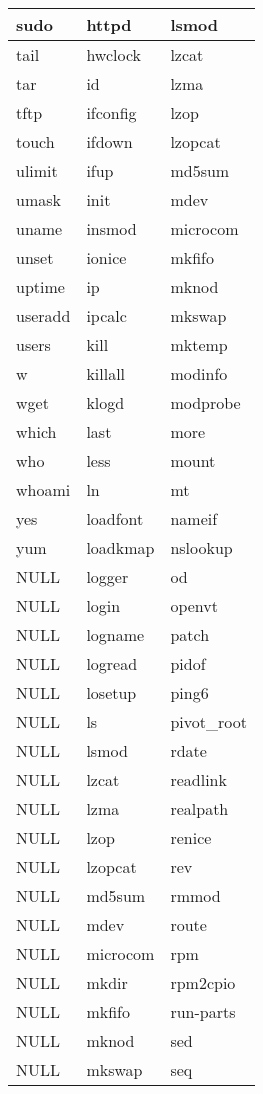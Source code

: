 \begin{longtable}{llp{64mm}}
sudo & httpd & lsmod \\ \hline
tail & hwclock & lzcat \\ \hline
tar & id & lzma \\ \hline
tftp & ifconfig & lzop \\ \hline
touch & ifdown & lzopcat \\ \hline
ulimit & ifup & md5sum \\ \hline
umask & init & mdev \\ \hline
uname & insmod & microcom \\ \hline
unset & ionice & mkfifo \\ \hline
uptime & ip & mknod \\ \hline
useradd & ipcalc & mkswap \\ \hline
users & kill & mktemp \\ \hline
w & killall & modinfo \\ \hline
wget & klogd & modprobe \\ \hline
which & last & more \\ \hline
who & less & mount \\ \hline
whoami & ln & mt \\ \hline
yes & loadfont & nameif \\ \hline
yum & loadkmap & nslookup \\ \hline
NULL & logger & od \\ \hline
NULL & login & openvt \\ \hline
NULL & logname & patch \\ \hline
NULL & logread & pidof \\ \hline
NULL & losetup & ping6 \\ \hline
NULL & ls & pivot\_root \\ \hline
NULL & lsmod & rdate \\ \hline
NULL & lzcat & readlink \\ \hline
NULL & lzma & realpath \\ \hline
NULL & lzop & renice \\ \hline
NULL & lzopcat & rev \\ \hline
NULL & md5sum & rmmod \\ \hline
NULL & mdev & route \\ \hline
NULL & microcom & rpm \\ \hline
NULL & mkdir & rpm2cpio \\ \hline
NULL & mkfifo & run-parts \\ \hline
NULL & mknod & sed \\ \hline
NULL & mkswap & seq \\ \hline

\end{longtable}
